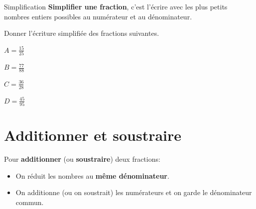 \documentclass[a4paper]{book}
\begin{document}
    
    \begin{definitionTitre}{Simplification}
        \textbf{Simplifier une fraction}, c'est l'écrire avec les plus petits nombres entiers possibles au numérateur et au dénominateur.
    \end{definitionTitre}
        
        
    \begin{exemple}
        Donner l'écriture simplifiée des fractions suivantes.

        \begin{minipage}{0.24\linewidth}
            $A = \frac{15}{25}$

            \vspace{2cm}
        \end{minipage}
        \hfill\vline \hfill
        \begin{minipage}{0.24\linewidth}
            $B = \frac{77}{88}$

            \vspace{2cm}
        \end{minipage}
        \hfill\vline \hfill
        \begin{minipage}{0.24\linewidth}
            $C = \frac{36}{28}$        

            \vspace{2cm}
        \end{minipage}
        \hfill\vline \hfill
        \begin{minipage}{0.24\linewidth}
            $D = \frac{45}{95}$

            \vspace{2cm}
        \end{minipage}
    \end{exemple}
    
    
\section{Additionner et soustraire}
    
    \begin{propriete}
        Pour \textbf{additionner} (ou \textbf{soustraire}) deux fractions:
        \begin{itemize}
            \item On réduit les nombres au \textbf{même dénominateur}.
            \item On additionne (ou on soustrait) les numérateurs et on garde le dénominateur commun.
        \end{itemize}
    \end{propriete}
\end{document}

